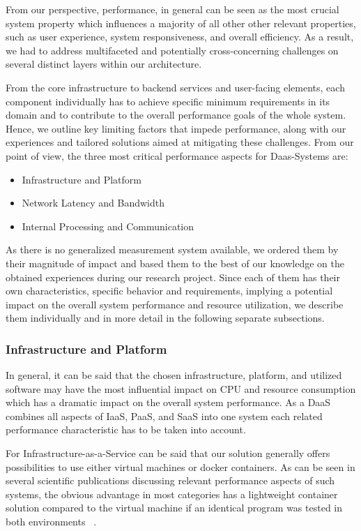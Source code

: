 \documentclass[runningheads]{llncs}
\begin{document}
From our perspective, performance, in general can be seen as the most crucial system property
which influences a majority of all other other relevant properties,
such as user experience, system responsiveness, and overall efficiency.
As a result, we had to address multifaceted
and potentially cross-concerning challenges
on several distinct layers within our architecture.

From the core infrastructure to backend services
and user-facing elements, each component individually
has to achieve specific minimum requirements in its domain
and to contribute to the overall performance goals of the whole system.
Hence, we outline key limiting factors that impede performance,
along with our experiences and tailored solutions
aimed at mitigating these challenges.
From our point of view, the three most critical performance aspects
for Daas-Systems are:
\begin{itemize}
	\item Infrastructure and Platform
	\item Network Latency and Bandwidth
	\item Internal Processing and Communication
\end{itemize}
As there is no generalized measurement system available,
we ordered them by their magnitude of impact
and based them to the best of our knowledge
on the obtained experiences during our research project.
Since each of them has their own characteristics,
specific behavior and requirements, implying a potential impact
on the overall system performance and resource utilization,
we describe them individually and in more detail
in the following separate subsections.

\subsubsection{Infrastructure and Platform}
In general, it can be said that the chosen infrastructure, platform, and utilized software
may have the most influential impact on CPU and resource consumption
which has a dramatic impact on the overall system performance.
As a DaaS combines all aspects of IaaS, PaaS, and SaaS into one system
each related performance characteristic has to be taken into account.

For Infrastructure-as-a-Service can be said
that our solution generally offers possibilities
to use either virtual machines or docker containers.
As can be seen in several scientific publications
discussing relevant performance aspects of such systems,
the obvious advantage in most categories
has a lightweight container solution compared to the virtual machine
if an identical program was tested in both environments
~\cite{felter2015updated,potdar2020performance,seo2014performance}.
\end{document}
